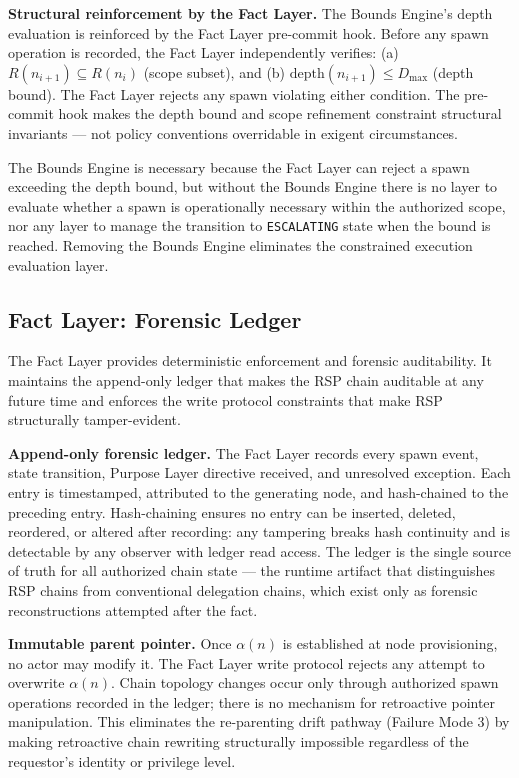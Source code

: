 \medskip
\noindent\textbf{Structural reinforcement by the Fact Layer.} The Bounds Engine's depth evaluation is reinforced by the Fact Layer pre-commit hook. Before any spawn operation is recorded, the Fact Layer independently verifies: (a) $R(n_{i+1}) \subseteq R(n_i)$ (scope subset), and (b) $\mathrm{depth}(n_{i+1}) \leq D_{\mathrm{max}}$ (depth bound). The Fact Layer rejects any spawn violating either condition. The pre-commit hook makes the depth bound and scope refinement constraint structural invariants — not policy conventions overridable in exigent circumstances.

The Bounds Engine is necessary because the Fact Layer can reject a spawn exceeding the depth bound, but without the Bounds Engine there is no layer to evaluate whether a spawn is operationally necessary within the authorized scope, nor any layer to manage the transition to \texttt{ESCALATING} state when the bound is reached. Removing the Bounds Engine eliminates the constrained execution evaluation layer.

\subsection{Fact Layer: Forensic Ledger}
\label{sec:rs-fact-ledger}

The Fact Layer provides deterministic enforcement and forensic auditability. It maintains the append-only ledger that makes the RSP chain auditable at any future time and enforces the write protocol constraints that make RSP structurally tamper-evident.

\medskip
\noindent\textbf{Append-only forensic ledger.} The Fact Layer records every spawn event, state transition, Purpose Layer directive received, and unresolved exception. Each entry is timestamped, attributed to the generating node, and hash-chained to the preceding entry. Hash-chaining ensures no entry can be inserted, deleted, reordered, or altered after recording: any tampering breaks hash continuity and is detectable by any observer with ledger read access. The ledger is the single source of truth for all authorized chain state — the runtime artifact that distinguishes RSP chains from conventional delegation chains, which exist only as forensic reconstructions attempted after the fact.

\medskip
\noindent\textbf{Immutable parent pointer.} Once $\alpha(n)$ is established at node provisioning, no actor may modify it. The Fact Layer write protocol rejects any attempt to overwrite $\alpha(n)$. Chain topology changes occur only through authorized spawn operations recorded in the ledger; there is no mechanism for retroactive pointer manipulation. This eliminates the re-parenting drift pathway (Failure Mode 3) by making retroactive chain rewriting structurally impossible regardless of the requestor's identity or privilege level.

